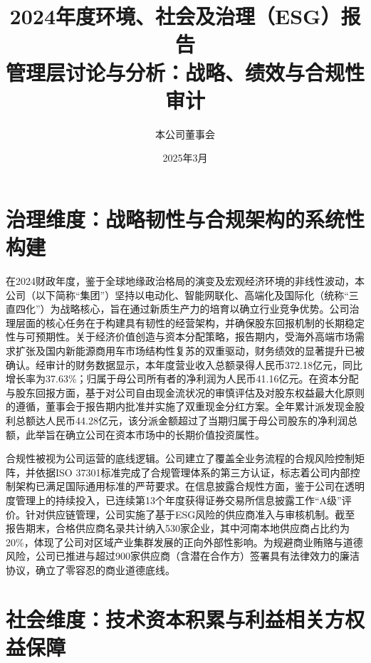 \documentclass[a4paper,12pt]{article}
\title{\textbf{\huge 2024年度环境、社会及治理（ESG）报告}\\ \vspace{0.5em} \large 管理层讨论与分析：战略、绩效与合规性审计}
\author{本公司董事会}
\date{2025年3月}
\begin{document}
\maketitle

\section{治理维度：战略韧性与合规架构的系统性构建}

在2024财政年度，鉴于全球地缘政治格局的演变及宏观经济环境的非线性波动，本公司（以下简称“集团”）坚持以电动化、智能网联化、高端化及国际化（统称“三直四化”）为战略核心，旨在通过新质生产力的培育以确立行业竞争优势。公司治理层面的核心任务在于构建具有韧性的经营架构，并确保股东回报机制的长期稳定性与可预期性。关于经济价值创造与资本分配策略，报告期内，受海外高端市场需求扩张及国内新能源商用车市场结构性复苏的双重驱动，财务绩效的显著提升已被确认。经审计的财务数据显示，本年度营业收入总额录得人民币372.18亿元，同比增长率为37.63\%；归属于母公司所有者的净利润为人民币41.16亿元。在资本分配与股东回报方面，基于对公司自由现金流状况的审慎评估及对股东权益最大化原则的遵循，董事会于报告期内批准并实施了双重现金分红方案。全年累计派发现金股利总额达人民币44.28亿元，该分派金额超过了当期归属于母公司股东的净利润总额，此举旨在确立公司在资本市场中的长期价值投资属性。

合规性被视为公司运营的底线逻辑。公司建立了覆盖全业务流程的合规风险控制矩阵，并依据ISO 37301标准完成了合规管理体系的第三方认证，标志着公司内部控制架构已满足国际通用标准的严苛要求。在信息披露合规性方面，鉴于公司在透明度管理上的持续投入，已连续第13个年度获得证券交易所信息披露工作“A级”评价。针对供应链管理，公司实施了基于ESG风险的供应商准入与审核机制。截至报告期末，合格供应商名录共计纳入530家企业，其中河南本地供应商占比约为20\%，体现了公司对区域产业集群发展的正向外部性影响。为规避商业贿赂与道德风险，公司已推进与超过900家供应商（含潜在合作方）签署具有法律效力的廉洁协议，确立了零容忍的商业道德底线。

\section{社会维度：技术资本积累与利益相关方权益保障}
\end{document}
